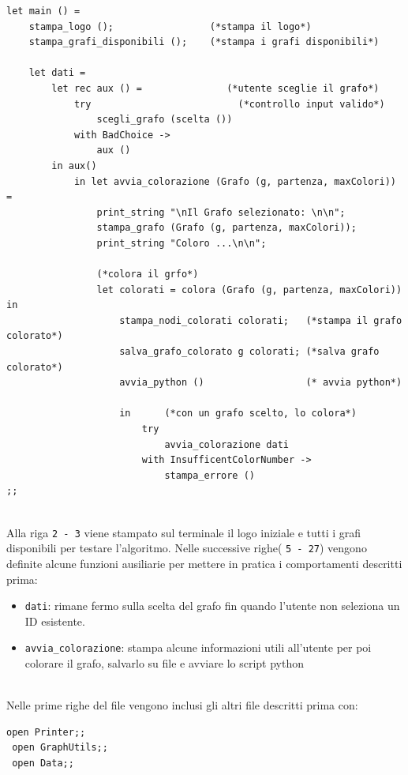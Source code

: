 \begin{lstlisting}[style=camlt, caption={Parte del codice contenuto in main.ml }]
let main () = 
	stampa_logo ();                 (*stampa il logo*)
	stampa_grafi_disponibili ();    (*stampa i grafi disponibili*)

	let dati = 
		let rec aux () =               (*utente sceglie il grafo*)
			try                          (*controllo input valido*)
				scegli_grafo (scelta ())
			with BadChoice -> 
				aux () 
		in aux() 
			in let avvia_colorazione (Grafo (g, partenza, maxColori)) = 
				print_string "\nIl Grafo selezionato: \n\n"; 
				stampa_grafo (Grafo (g, partenza, maxColori)); 
				print_string "Coloro ...\n\n";
				 
				(*colora il grfo*)
				let colorati = colora (Grafo (g, partenza, maxColori)) in     
					stampa_nodi_colorati colorati;   (*stampa il grafo colorato*)
					salva_grafo_colorato g colorati; (*salva grafo colorato*)
					avvia_python ()                  (* avvia python*)

					in      (*con un grafo scelto, lo colora*)
						try                                
							avvia_colorazione dati  
						with InsufficentColorNumber -> 
							stampa_errore ()
;;

\end{lstlisting}
\ \\
Alla riga \lstinline[style=cmd]|2 - 3| viene stampato sul terminale il logo iniziale e tutti i grafi disponibili per testare l'algoritmo. Nelle successive righe( \lstinline[style=cmd]|5 - 27|) vengono definite alcune funzioni ausiliarie per mettere in pratica i comportamenti descritti prima:

\begin{itemize}
	\item \lstinline[style=cmd]|dati|: rimane fermo sulla scelta del grafo fin quando l'utente non seleziona un ID esistente. %
	\item \lstinline[style=cmd]|avvia_colorazione|: stampa alcune informazioni utili all'utente per poi colorare il grafo, salvarlo su file e avviare lo script python
\end{itemize}
\ \\
Nelle prime righe del file vengono inclusi gli altri file descritti prima con:

\begin{lstlisting}[style=caml, caption={Inclusione degli altri file .ml}]
 open Printer;;
 open GraphUtils;;
 open Data;;
\end{lstlisting}
